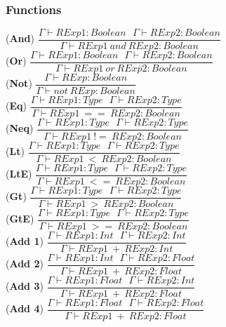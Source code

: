 \documentclass[12pt]{article}
\begin{document}
\subsubsection*{Functions}
\begin{center}
\noindent(\textbf{And})
$\dfrac{\Gamma \vdash RExp1:Boolean\ \ \ \Gamma \vdash RExp2:Boolean}{\Gamma \vdash RExp1\ and\ RExp2:Boolean}$\\[0.1in]
\noindent(\textbf{Or})
$\dfrac{\Gamma \vdash RExp1:Boolean\ \ \ \Gamma \vdash RExp2:Boolean}{\Gamma \vdash RExp1\ or\ RExp2:Boolean}$\\[0.1in]
\noindent(\textbf{Not})
$\dfrac{\Gamma \vdash RExp:Boolean}{\Gamma \vdash not\  RExp:Boolean}$\\[0.1in]

\noindent(\textbf{Eq})
$\dfrac{\Gamma \vdash RExp1:Type\ \ \ \Gamma \vdash RExp2:Type}{\Gamma \vdash RExp1\ ==\ RExp2:Boolean}$\\[0.1in]
\noindent(\textbf{Neq})
$\dfrac{\Gamma \vdash RExp1:Type\ \ \ \Gamma \vdash RExp2:Type}{\Gamma \vdash RExp1\ !=\ RExp2:Boolean}$\\[0.1in]
\noindent(\textbf{Lt})
$\dfrac{\Gamma \vdash RExp1:Type\ \ \ \Gamma \vdash RExp2:Type}{\Gamma \vdash RExp1\ <\ RExp2:Boolean}$\\[0.1in]
\noindent(\textbf{LtE})
$\dfrac{\Gamma \vdash RExp1:Type\ \ \ \Gamma \vdash RExp2:Type}{\Gamma \vdash RExp1\ <=\ RExp2:Boolean}$\\[0.1in]
\noindent(\textbf{Gt})
$\dfrac{\Gamma \vdash RExp1:Type\ \ \ \Gamma \vdash RExp2:Type}{\Gamma \vdash RExp1\ >\ RExp2:Boolean}$\\[0.1in]
\noindent(\textbf{GtE})
$\dfrac{\Gamma \vdash RExp1:Type\ \ \ \Gamma \vdash RExp2:Type}{\Gamma \vdash RExp1\ >=\ RExp2:Boolean}$\\[0.1in]

\noindent(\textbf{Add 1})
$\dfrac{\Gamma \vdash RExp1:Int\ \ \ \Gamma \vdash RExp2:Int}{\Gamma \vdash RExp1\ +\ RExp2:Int}$\\[0.1in]
\noindent(\textbf{Add 2})
$\dfrac{\Gamma \vdash RExp1:Int\ \ \ \Gamma \vdash RExp2:Float}{\Gamma \vdash RExp1\ +\ RExp2:Float}$\\[0.1in]
\noindent(\textbf{Add 3})
$\dfrac{\Gamma \vdash RExp1:Float\ \ \ \Gamma \vdash RExp2:Int}{\Gamma \vdash RExp1\ +\ RExp2:Float}$\\[0.1in]
\noindent(\textbf{Add 4})
$\dfrac{\Gamma \vdash RExp1:Float\ \ \ \Gamma \vdash RExp2:Float}{\Gamma \vdash RExp1\ +\ RExp2:Float}$\\[0.1in]


\end{center}
\end{document}
